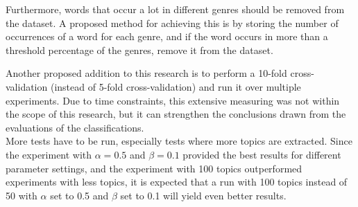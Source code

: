 Furthermore, words that occur a lot in different genres should be removed from the dataset. A proposed method for achieving this is by storing the number of occurrences of a word for each genre, and if the word occurs in more than a threshold percentage of the genres, remove it from the dataset.

Another proposed addition to this research is to perform a 10-fold cross-validation (instead of 5-fold cross-validation) and run it over multiple experiments. Due to time constraints, this extensive measuring was not within the scope of this research, but it can strengthen the conclusions drawn from the evaluations of the classifications. \\
More tests have to be run, especially tests where more topics are extracted. Since the experiment with $\alpha = 0.5$ and $\beta = 0.1$ provided the best results for different parameter settings, and the experiment with 100 topics outperformed experiments with less topics, it is expected that a run with 100 topics instead of 50 with $\alpha$ set to 0.5 and $\beta$ set to 0.1 will yield even better results.